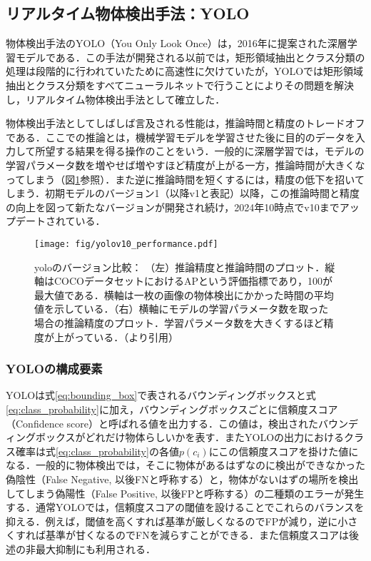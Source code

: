     \subsection{リアルタイム物体検出手法：YOLO}
    \label{subsec:object_detection}

    物体検出手法のYOLO（You Only Look Once）\cite{redmon2016you, alif2024yolov1}は，2016年に提案された深層学習モデルである．この手法が開発される以前では，矩形領域抽出とクラス分類の処理は段階的に行われていた\cite{girshick2014rich,girshick2015fast,ren2016faster}ために高速性に欠けていたが，YOLOでは矩形領域抽出とクラス分類をすべてニューラルネットで行うことによりその問題を解決し，リアルタイム物体検出手法として確立した．

    物体検出手法としてしばしば言及される性能は，推論時間と精度のトレードオフである．ここでの推論とは，機械学習モデルを学習させた後に目的のデータを入力して所望する結果を得る操作のことをいう．一般的に深層学習では，モデルの学習パラメータ数を増やせば増やすほど精度が上がる一方，推論時間が大きくなってしまう（図\ref{fig:yolo_tradeoff}参照）．また逆に推論時間を短くするには，精度の低下を招いてしまう．初期モデルのバージョン1（以降v1と表記）以降，この推論時間と精度の向上を図って新たなバージョンが開発され続け，2024年10時点でv10までアップデートされている．

    \begin{figure}[t]
        \centering
        \texttt{[image: fig/yolov10\_performance.pdf]}
        \caption[yoloのバージョン比較]{yoloのバージョン比較：
        （左）推論精度と推論時間のプロット．縦軸はCOCOデータセットにおけるAPという評価指標であり，100が最大値である．横軸は一枚の画像の物体検出にかかった時間の平均値を示している．（右）横軸にモデルの学習パラメータ数を取った場合の推論精度のプロット．学習パラメータ数を大きくするほど精度が上がっている．（\cite{wang2024yolov10}より引用）}
        \label{fig:yolo_tradeoff}
    \end{figure}    

    \subsubsection{YOLOの構成要素}
    \label{subsubsec:yolo_components}

    YOLOは式\ref{eq:bounding_box}で表されるバウンディングボックスと式\ref{eq:class_probability}に加え，バウンディングボックスごとに信頼度スコア（Confidence score）と呼ばれる値を出力する．この値は，検出されたバウンディングボックスがどれだけ物体らしいかを表す．またYOLOの出力におけるクラス確率は式\ref{eq:class_probability}の各値$p(c_i)$にこの信頼度スコアを掛けた値になる．一般的に物体検出では，そこに物体があるはずなのに検出ができなかった偽陰性（False Negative, 以後FNと呼称する）と，物体がないはずの場所を検出してしまう偽陽性（False Positive, 以後FPと呼称する）の二種類のエラーが発生する．通常YOLOでは，信頼度スコアの閾値を設けることでこれらのバランスを抑える．例えば，閾値を高くすれば基準が厳しくなるのでFPが減り，逆に小さくすれば基準が甘くなるのでFNを減らすことができる．また信頼度スコアは後述の非最大抑制にも利用される．

